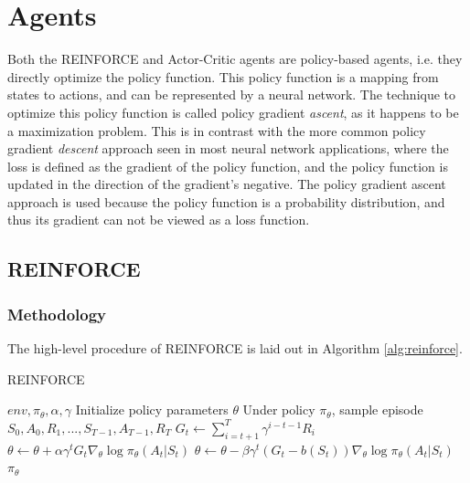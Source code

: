 \documentclass{article}
\begin{document}
\section{Agents}
\label{Agents}

Both the REINFORCE and Actor-Critic agents are policy-based agents, i.e. they directly optimize the policy function.
This policy function is a mapping from states to actions, and can be represented by a neural network.
The technique to optimize this policy function is called policy gradient \textit{ascent}, as it happens to be a maximization problem.
This is in contrast with the more common policy gradient \textit{descent} approach seen in most neural network applications, where the loss is defined as the gradient of the policy function, and the policy function is updated in the direction of the gradient's negative.
The policy gradient ascent approach is used because the policy function is a probability distribution, and thus its gradient can not be viewed as a loss function.

\subsection{REINFORCE}
\label{A-REINFORCE}


\subsubsection{Methodology}
\label{R-Method}


The high-level procedure of REINFORCE is laid out in Algorithm \ref{alg:reinforce}.

\begin{algorithm}[htbp]
    \caption{REINFORCE}
    \label{alg:reinforce}
    \begin{algorithmic}
         $env, \pi_{\theta}, \alpha, \gamma$
        \STATE Initialize policy parameters $\theta$
        \REPEAT
            \STATE Under policy $\pi_{\theta}$, 
            \STATE sample episode $S_0, A_0, R_1, ..., S_{T-1}, A_{T-1}, R_T$
                \STATE $G_t \gets \sum\limits_{i=t+1}^T \gamma^{i-t-1} R_i$
                \STATE $\theta \gets \theta + \alpha \gamma^t G_t \nabla_{\theta} \log \pi_{\theta}(A_t|S_t)$
                \STATE $\theta \gets \theta - \beta \gamma^t (G_t - b(S_t)) \nabla_{\theta} \log \pi_{\theta}(A_t|S_t)$
            \ENDFOR
         $\pi_{\theta}$
    \end{algorithmic}
\end{algorithm}
\end{document}
